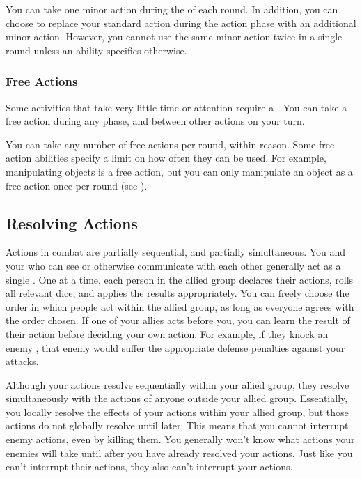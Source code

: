       You can take one minor action during the  of each round.
      In addition, you can choose to replace your standard action during the action phase with an additional minor action.
      However, you cannot use the same minor action twice in a single round unless an ability specifies otherwise.

    \subsubsection{Free Actions}\label{Free Actions}
      Some activities that take very little time or attention require a .
      You can take a free action during any phase, and between other actions on your turn.

      You can take any number of free actions per round, within reason.
      Some free action abilities specify a limit on how often they can be used.
      For example, manipulating objects is a free action, but you can only manipulate an object as a free action once per round (see ).

  \subsection{Resolving Actions}\label{Resolving Actions}

    Actions in combat are partially sequential, and partially simultaneous.
    You and your  who can see or otherwise communicate with each other generally act as a single .
    One at a time, each person in the allied group declares their actions, rolls all relevant dice, and applies the results appropriately.
    You can freely choose the order in which people act within the allied group, as long as everyone agrees with the order chosen.
    If one of your allies acts before you, you can learn the result of their action before deciding your own action.
    For example, if they knock an enemy \prone, that enemy would suffer the appropriate defense penalties against your attacks.

    Although your actions resolve sequentially within your allied group, they resolve simultaneously with the actions of anyone outside your allied group.
    Essentially, you locally resolve the effects of your actions within your allied group, but those actions do not globally resolve until later.
    This means that you cannot interrupt enemy actions, even by killing them.
    You generally won't know what actions your enemies will take until after you have already resolved your actions.
    Just like you can't interrupt their actions, they also can't interrupt your actions.

